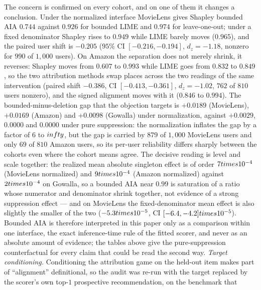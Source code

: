 \documentclass[manuscript,screen,anonymous]{acmart}
\begin{document}
The concern is confirmed on every cohort, and on one of them it changes a
conclusion. Under the normalized interface MovieLens gives Shapley bounded AIA $0.744$
against $0.926$ for bounded LIME and $0.974$ for leave-one-out; under a fixed denominator
Shapley rises to $0.949$ while LIME barely moves ($0.965$), and the paired user shift is
$-0.205$ ($95\%$ CI $[-0.216,-0.194]$, $d_z=-1.18$, nonzero for $990$ of $1{,}000$
users). On Amazon the separation does not merely shrink, it reverses: Shapley moves from
$0.607$ to $0.993$ while LIME goes from $0.832$ to $0.849$, so the two attribution
methods swap places across the two readings of the same intervention (paired shift
$-0.386$, CI $[-0.413,-0.361]$, $d_z=-1.02$, $762$ of $810$ users nonzero), and the
signed alignment moves with it ($0.846$ to $0.994$). The bounded-minus-deletion gap that
the objection targets is $+0.0189$ (MovieLens), $+0.0169$ (Amazon) and $+0.0098$
(Gowalla) under normalization, against $+0.0029$, $0.0000$ and $0.0000$ under pure
suppression: the normalization inflates the gap by a factor of $6$ to $\\infty$, but the
gap is carried by $879$ of $1{,}000$ MovieLens users and only $69$ of $810$ Amazon
users, so its per-user reliability differs sharply between the cohorts even where the
cohort means agree. The decisive reading is level and scale together: the realized mean
absolute singleton effect is of order $7\\times10^{-4}$ (MovieLens normalized) and
$9\\times10^{-4}$ (Amazon normalized) against $2\\times10^{-4}$ on Gowalla, so a bounded
AIA near $0.99$ is saturation of a ratio whose numerator and denominator shrink
together, not evidence of a strong suppression effect --- and on MovieLens the
fixed-denominator mean effect is also slightly the smaller of the two
($-5.3\\times10^{-5}$, CI $[-6.4,-4.2]\\times10^{-5}$). Bounded AIA is therefore
interpreted in this paper only as a comparison within one interface, the exact
inference-time rule of the fitted scorer, and never as an absolute amount of evidence;
the tables above give the pure-suppression counterfactual for every claim that could be
read the second way.
\emph{Target conditioning.} Conditioning the attribution game on the held-out
item makes part of ``alignment'' definitional, so the audit was re-run with the target
replaced by the scorer's own top-$1$ prospective recommendation, on the benchmark that
\end{document}
